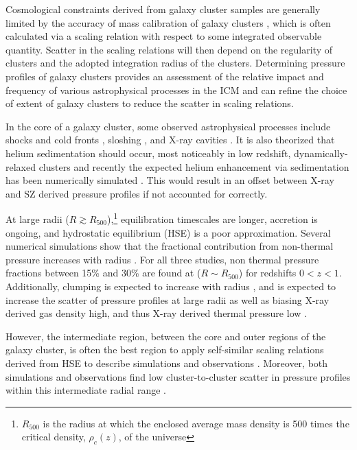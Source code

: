 \documentclass[iop,numberedappendix,apj]{emulateapj}
\begin{document}
Cosmological constraints derived from galaxy cluster samples are generally limited by the accuracy of mass calibration of 
galaxy clusters \citep[e.g.][]{hasselfield2013, reichardt2013}, which is often calculated via a scaling relation with 
respect to some integrated observable quantity. Scatter in the scaling relations will then depend on the regularity of 
clusters and the adopted integration radius of the clusters. Determining pressure profiles of galaxy clusters provides an 
assessment of the relative impact and frequency of various astrophysical processes in the ICM and can refine the choice of 
extent of galaxy clusters to reduce the scatter in scaling relations.

In the core of a galaxy cluster, some observed astrophysical processes include shocks and cold fronts 
\citep[e.g.][]{markevitch2007}, sloshing \citep[e.g.][]{fabian2006}, and X-ray cavities \citep{mcnamara2007}. 
It is also theorized that helium sedimentation should occur, most noticeably in low redshift, dynamically-relaxed 
clusters \citep{abramopoulos1981, gilfanov1984} 
and recently the expected helium enhancement via sedimentation has been numerically simulated \citep{peng2009}. 
This would result in an offset between X-ray and SZ derived pressure profiles if not accounted for correctly.

At large radii ($R \gtrsim R_{500}$),\footnote{$R_{500}$ is the radius at which the enclosed average mass density is 
500 times the critical density, $\rho_c(z)$, of the universe} equilibration timescales are longer, accretion is ongoing, 
and hydrostatic equilibrium (HSE) is a poor approximation. Several numerical simulations show that the fractional contribution
from non-thermal pressure increases with radius \citep{shaw2010,battaglia2012,nelson2014}. 
For all three studies, non thermal pressure fractions between 15\% and 30\% are found at ($R \sim R_{500}$)
for redshifts $0 < z < 1$. Additionally, clumping is expected to increase with radius \citep{kravtsov2012}, and is expected to
increase the scatter of pressure profiles at large radii \citep{nagai2011} as well as biasing X-ray derived gas density high,
and thus X-ray derived thermal pressure low \citep{battaglia2015}.

However, the intermediate region, between the core and outer regions of the galaxy cluster, 
is often the best region to apply self-similar scaling relations derived from HSE to describe simulations 
and observations \citep[e.g.][]{kravtsov2012}. Moreover, both simulations and observations find low
cluster-to-cluster scatter in pressure profiles within this intermediate radial range \citep[e.g.][]{borgani2004,
nagai2007,arnaud2010,bonamente2012,planck2013a,sayers2013}.
\end{document}
